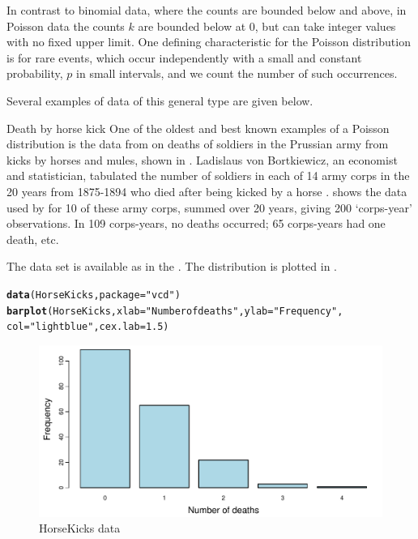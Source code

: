\documentclass[11pt]{book}\usepackage[]{graphicx}\usepackage[]{color}
\makeatletter
\newcommand{\hlnum}[1]{\textcolor[rgb]{0.686,0.059,0.569}{#1}}%
\newcommand{\hlstr}[1]{\textcolor[rgb]{0.192,0.494,0.8}{#1}}%
\newcommand{\hlstd}[1]{\textcolor[rgb]{0.345,0.345,0.345}{#1}}%
\newcommand{\hlkwc}[1]{\textcolor[rgb]{0.333,0.667,0.333}{#1}}%
\newcommand{\hlkwd}[1]{\textcolor[rgb]{0.737,0.353,0.396}{\textbf{#1}}}%
\newenvironment{kframe}{%
 \def\at@end@of@kframe{}%
 \ifinner\ifhmode%
  \def\at@end@of@kframe{\end{minipage}}%
  \begin{minipage}{\columnwidth}%
 \fi\fi%
 \def\FrameCommand##1{\hskip\@totalleftmargin \hskip-\fboxsep
 \colorbox{shadecolor}{##1}\hskip-\fboxsep
     \hskip-\linewidth \hskip-\@totalleftmargin \hskip\columnwidth}%
 \MakeFramed {\advance\hsize-\width
   \@totalleftmargin\z@ \linewidth\hsize
   \@setminipage}}%
 {\par\unskip\endMakeFramed%
 \at@end@of@kframe}
\newenvironment{knitrout}{}{} %
\renewenvironment{knitrout}{\small\renewcommand{\baselinestretch}{.85}}{} %
\makeatother
\begin{document}
In contrast to binomial data, where the counts are bounded below and above,
in Poisson data the counts $k$ are bounded below at 0, but can take integer
values with no fixed upper limit.
One defining characteristic for the Poisson distribution is for rare
events, which occur independently with a small and constant probability, $p$
in small intervals, and we count the number of such occurrences.

Several examples of data of this general type are given below.

\begin{Example}[horskick1]{Death by horse kick}
One of the oldest and best known examples of a Poisson distribution
is the data from
\citet{Bortkiewicz:98} on deaths of soldiers in the Prussian
army from kicks by horses and mules, shown in .
Ladislaus von Bortkiewicz, an economist and statistician,
tabulated the number of soldiers in each of
14 army corps in the 20 years from 1875-1894
who died after being kicked by a horse
\citep[p. 18]{AndrewsHerzberg:85}.
 shows the data used by
\citet{Fisher:25} for 10 of these
army corps, summed over 20 years, giving 200
`corps-year' observations.  In 109 corps-years,
no deaths occurred; 65 corps-years had one death, etc.

The data set is available as  in the .
The distribution is plotted in .


\begin{knitrout}
\color{fgcolor}\begin{kframe}
\begin{alltt}
\hlkwd{data}\hlstd{(HorseKicks,} \hlkwc{package}\hlstd{=}\hlstr{"vcd"}\hlstd{)}
\hlkwd{barplot}\hlstd{(HorseKicks,} \hlkwc{xlab}\hlstd{=}\hlstr{"Number of deaths"}\hlstd{,} \hlkwc{ylab}\hlstd{=}\hlstr{"Frequency"}\hlstd{,}
        \hlkwc{col}\hlstd{=}\hlstr{"lightblue"}\hlstd{,} \hlkwc{cex.lab}\hlstd{=}\hlnum{1.5}\hlstd{)}
\end{alltt}
\end{kframe}\begin{figure}[htbp]


\centerline{\includegraphics[width=.75\textwidth]{ch03/fig/horsekicks} }

\caption[HorseKicks data]{HorseKicks data\label{fig:horsekicks}}
\end{figure}


\end{knitrout}

\end{Example}
\end{document}
